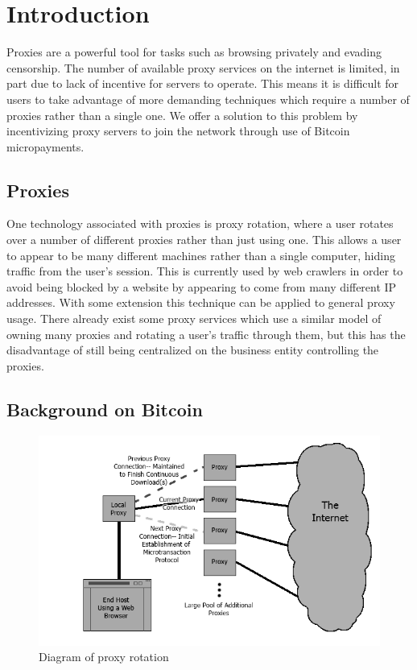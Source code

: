 \section{Introduction}
\label{sec:intro}

Proxies are a powerful tool for tasks such as browsing privately and evading censorship. The number of available proxy services on the internet is limited, in part due to lack of incentive for servers to operate. This means it is difficult for users to take advantage of more demanding techniques which require a number of proxies rather than a single one. We offer a solution to this problem by incentivizing proxy servers to join the network through use of Bitcoin micropayments. 

\subsection{Proxies}

One technology associated with proxies is proxy rotation, where a user rotates over a number of different proxies rather than just using one. This allows a user to appear to be many different machines rather than a single computer, hiding traffic from the user's session. This is currently used by web crawlers in order to avoid being blocked by a website by appearing to come from many different IP addresses. With some extension this technique can be applied to general proxy usage. There already exist some proxy services which use a similar model of owning many proxies and rotating a user's traffic through them, but this has the disadvantage of still being centralized on the business entity controlling the proxies.

\subsection{Background on Bitcoin}
\begin{figure}
  \centering
  \includegraphics[width=1.05\textwidth]{proxydiagram.png}
  \caption{Diagram of proxy rotation}
  \label{fig:proxy-diagram}
\end{figure}

